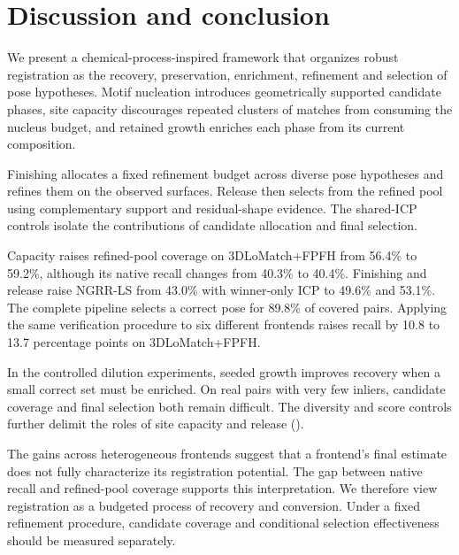 \section{Discussion and conclusion}
\label{sec:conclusion}

We present a chemical-process-inspired framework that organizes robust registration as the recovery, preservation, enrichment, refinement and selection of pose hypotheses. Motif nucleation introduces geometrically supported candidate phases, site capacity discourages repeated clusters of matches from consuming the nucleus budget, and retained growth enriches each phase from its current composition.

Finishing allocates a fixed refinement budget across diverse pose hypotheses and refines them on the observed surfaces. Release then selects from the refined pool using complementary support and residual-shape evidence. The shared-ICP controls isolate the contributions of candidate allocation and final selection.

Capacity raises refined-pool coverage on 3DLoMatch+FPFH from 56.4\% to 59.2\%, although its native recall changes from 40.3\% to 40.4\%. Finishing and release raise NGRR-LS from 43.0\% with winner-only ICP to 49.6\% and 53.1\%. The complete pipeline selects a correct pose for 89.8\% of covered pairs. Applying the same verification procedure to six different frontends raises recall by 10.8 to 13.7 percentage points on 3DLoMatch+FPFH.

In the controlled dilution experiments, seeded growth improves recovery when a small correct set must be enriched. On real pairs with very few inliers, candidate coverage and final selection both remain difficult. The diversity and score controls further delimit the roles of site capacity and release ().

The gains across heterogeneous frontends suggest that a frontend's final estimate does not fully characterize its registration potential. The gap between native recall and refined-pool coverage supports this interpretation. We therefore view registration as a budgeted process of recovery and conversion. Under a fixed refinement procedure, candidate coverage and conditional selection effectiveness should be measured separately.
